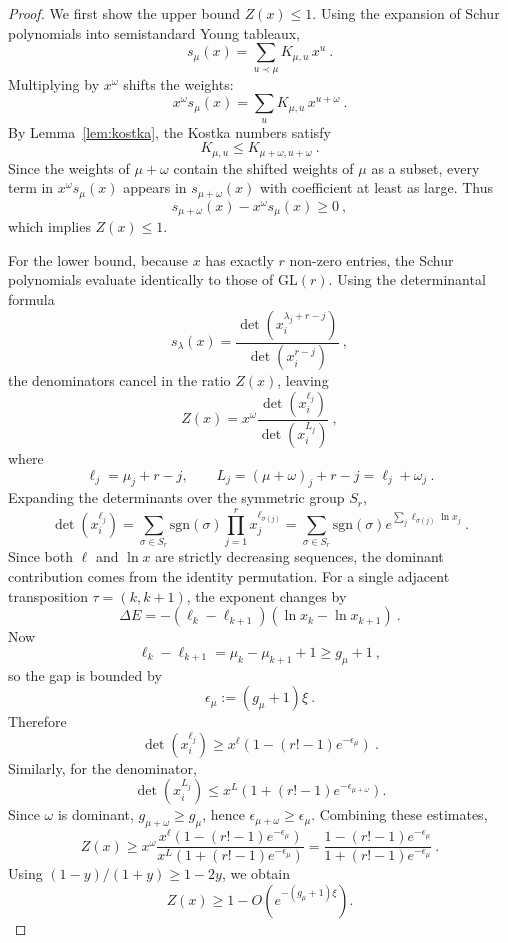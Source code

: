 \documentclass[a4paper,onecolumn,11pt]{quantumarticle}
\begin{document}
\begin{proof}
We first show the upper bound \(Z(x)\le 1\). Using the expansion of Schur polynomials into semistandard Young tableaux,
\begin{equation}
    s_\mu(x) = \sum_{u\prec\mu} K_{\mu,u}\,x^u \ .
\end{equation}
Multiplying by \(x^\omega\) shifts the weights:
\[
x^\omega s_\mu(x)=\sum_u K_{\mu,u}\,x^{u+\omega}\ .
\]
By Lemma~\ref{lem:kostka}, the Kostka numbers satisfy
\[
K_{\mu,u}\le K_{\mu+\omega,u+\omega}\ .
\]
Since the weights of \(\mu+\omega\) contain the shifted weights of \(\mu\) as a subset, every term in \(x^\omega s_\mu(x)\) appears in \(s_{\mu+\omega}(x)\) with coefficient at least as large. Thus
\[
s_{\mu+\omega}(x)-x^\omega s_\mu(x)\ge 0\ ,
\]
which implies \(Z(x)\le 1\).

For the lower bound, because \(x\) has exactly \(r\) non-zero entries, the Schur polynomials evaluate identically to those of \(\mathrm{GL}(r)\). Using the determinantal formula
\[
s_\lambda(x)=\frac{\det(x_i^{\lambda_j+r-j})}{\det(x_i^{r-j})}\ ,
\]
the denominators cancel in the ratio \(Z(x)\), leaving
\[
    Z(x) =
    x^\omega \frac{\det(x_i^{\ell_j})}{\det(x_i^{L_j})}\ ,
\]
where
\[
\ell_j=\mu_j+r-j,
\qquad
L_j=(\mu+\omega)_j+r-j=\ell_j+\omega_j\ .
\]
Expanding the determinants over the symmetric group \(S_r\),
\begin{equation}
    \det(x_i^{\ell_j})
    = \sum_{\sigma\in S_r}\mathrm{sgn}(\sigma)\prod_{j=1}^r x_j^{\ell_{\sigma(j)}}
    = \sum_{\sigma\in S_r}\mathrm{sgn}(\sigma)
    e^{\sum_j \ell_{\sigma(j)}\ln x_j}\ .
\end{equation}
Since both \(\ell\) and \(\ln x\) are strictly decreasing sequences, the dominant contribution comes from the identity permutation. For a single adjacent transposition \(\tau=(k,k+1)\), the exponent changes by
\[
    \Delta E
    = -(\ell_k-\ell_{k+1})(\ln x_k-\ln x_{k+1})\ .
\]
Now
\[
\ell_k-\ell_{k+1}=\mu_k-\mu_{k+1}+1\ge g_\mu+1\ ,
\]
so the gap is bounded by
\[
\epsilon_\mu:= (g_\mu+1)\xi\ .
\]
Therefore
\begin{equation}
    \det(x_i^{\ell_j})
    \ge
    x^\ell \left(1-(r!-1)e^{-\epsilon_\mu}\right)\ .
\end{equation}
Similarly, for the denominator,
\begin{equation}
    \det(x_i^{L_j})
    \le
    x^L \left(1+(r!-1)e^{-\epsilon_{\mu+\omega}}\right).
\end{equation}
Since \(\omega\) is dominant, \(g_{\mu+\omega}\ge g_\mu\), hence \(\epsilon_{\mu+\omega}\ge \epsilon_\mu\). Combining these estimates,
\[
    Z(x)
    \ge
    x^\omega \frac{x^\ell (1-(r!-1)e^{-\epsilon_\mu})}{x^L (1+(r!-1)e^{-\epsilon_\mu})}
    =
    \frac{1-(r!-1)e^{-\epsilon_\mu}}{1+(r!-1)e^{-\epsilon_\mu}}\ .
\]
Using \((1-y)/(1+y)\ge 1-2y\), we obtain
\[
    Z(x)\ge 1-O\left(e^{-(g_\mu+1)\xi}\right).
\]




\end{proof}
\end{document}
